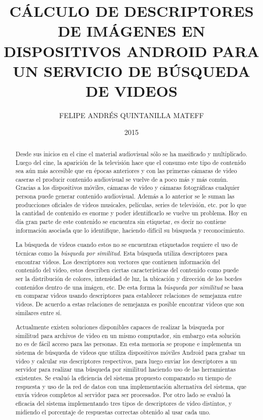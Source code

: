 \documentclass[upright, contnum]{umemoria}
\author{FELIPE ANDRÉS QUINTANILLA MATEFF}
\title{CÁLCULO DE DESCRIPTORES DE IMÁGENES EN DISPOSITIVOS ANDROID PARA UN SERVICIO DE BÚSQUEDA DE VIDEOS}
\date{2015}
\begin{document}
\frontmatter
\maketitle

\begin{abstract}

Desde sus inicios en el cine el material audiovisual sólo se ha masificado y multiplicado. Luego del cine, la aparición de la televisión hace que el consumo este tipo de contenido sea aún más accesible que en épocas anteriores y con las primeras cámaras de video caseras el producir contenido audiovisual se vuelve de a poco más y más común. Gracias a los dispositivos móviles, cámaras de video y cámaras fotográficas cualquier persona puede generar contenido audiovisual. Además a lo anterior se le suman las producciones oficiales de videos musicales, películas, series de televisión, etc. por lo que la cantidad de contenido es enorme y poder identificarlo se vuelve un problema. Hoy en día gran parte de este contenido se encuentra sin etiquetar, es decir no contiene información asociada que lo identifique, haciendo difícil su búsqueda y reconocimiento.

La búsqueda de videos cuando estos no se encuentran etiquetados requiere el uso de técnicas como la \textit{búsqueda por similitud}. Esta búsqueda utiliza descriptores para encontrar videos. Los descriptores son vectores que contienen información del contenido del video, estos describen ciertas características del contenido como puede ser la distribución de colores, intensidad de luz, la ubicación y dirección de los bordes contenidos dentro de una imágen, etc. De esta forma la \textit{búsqueda por similitud} se basa en comparar videos usando descriptores para establecer relaciones de semejanza entre videos. De acuerdo a estas relaciones de semejanza es posible encontrar videos que son similares entre sí. 

Actualmente existen soluciones disponibles capaces de realizar la búsqueda por similitud para archivos de video en un mismo computador, sin embargo esta solución no es de fácil acceso para las personas. En esta memoria se propone e implementa un sistema de búsqueda de videos que utiliza dispositivos móviles Android para grabar un video y calcular sus descriptores respectivos, para luego enviar los descriptores a un servidor para realizar una búsqueda por similitud haciendo uso de las herramientas existentes. Se evaluó la eficiencia del sistema propuesto comparando su tiempo de respuesta y uso de la red de datos con una implementación alternativa del sistema, que envía videos completos al servidor para ser procesados. Por otro lado se evaluó la eficacia del sistema implementando tres tipos de descriptores de video distintos, y midiendo el porcentaje de respuestas correctas obtenido al usar cada uno.


\end{abstract}
\end{document}
